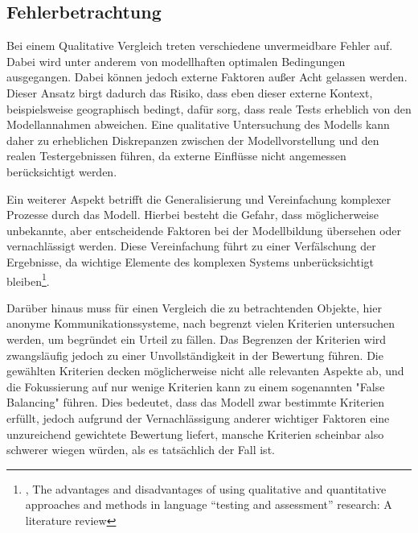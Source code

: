 \subsection{Fehlerbetrachtung}

Bei einem Qualitative Vergleich treten verschiedene unvermeidbare Fehler auf. Dabei wird unter anderem von modellhaften optimalen Bedingungen ausgegangen. Dabei können jedoch externe Faktoren außer Acht gelassen werden. Dieser Ansatz birgt dadurch das Risiko, dass eben dieser externe Kontext, beispielsweise geographisch bedingt, dafür sorg, dass reale Tests erheblich von den Modellannahmen abweichen. Eine qualitative Untersuchung des Modells kann daher zu erheblichen Diskrepanzen zwischen der Modellvorstellung und den realen Testergebnissen führen, da externe Einflüsse nicht angemessen berücksichtigt werden.

Ein weiterer Aspekt betrifft die Generalisierung und Vereinfachung komplexer Prozesse durch das Modell. Hierbei besteht die Gefahr, dass möglicherweise unbekannte, aber entscheidende Faktoren bei der Modellbildung übersehen oder vernachlässigt werden. Diese Vereinfachung führt zu einer Verfälschung der Ergebnisse, da wichtige Elemente des komplexen Systems unberücksichtigt bleiben\footnote{\cite{DisadvantagesOfQualitativApproaches}, The advantages and disadvantages of using qualitative and quantitative approaches and methods in language “testing and assessment” research: A literature review}.

Darüber hinaus muss für einen Vergleich die zu betrachtenden Objekte, hier anonyme Kommunikationssysteme, nach begrenzt vielen Kriterien untersuchen werden, um begründet ein Urteil zu fällen. Das Begrenzen der Kriterien wird zwangsläufig jedoch zu einer Unvollständigkeit in der Bewertung führen. Die gewählten Kriterien decken möglicherweise nicht alle relevanten Aspekte ab, und die Fokussierung auf nur wenige Kriterien kann zu einem sogenannten "False Balancing" führen. Dies bedeutet, dass das Modell zwar bestimmte Kriterien erfüllt, jedoch aufgrund der Vernachlässigung anderer wichtiger Faktoren eine unzureichend gewichtete Bewertung liefert, mansche Kriterien scheinbar also schwerer wiegen würden, als es tatsächlich der Fall ist.